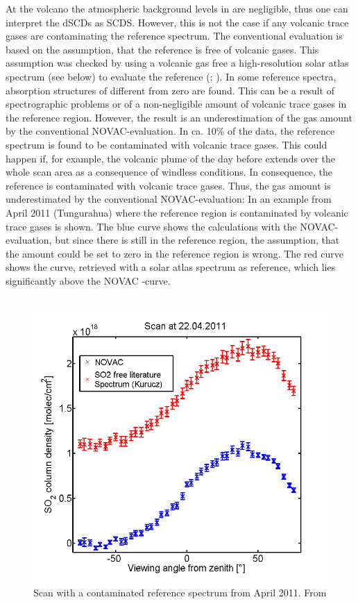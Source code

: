 At the volcano the atmospheric background levels in  are negligible, thus one can interpret the dSCDs as SCDS. However, this is not the case if any volcanic trace gases are contaminating the reference spectrum.
The conventional evaluation is based on the assumption, that the reference is free of volcanic gases. This assumption was checked by using a volcanic gas free a high-resolution solar atlas spectrum (see below) to evaluate the reference (\cite{lubcke2014optical}; \cite{salerno2009novel}). In some reference spectra, absorption structures of   different from zero are found. This can be a result of spectrographic problems or of a non-negligible amount of volcanic trace gases in the reference region. However, the result is an underestimation of the gas amount by the conventional NOVAC-evaluation.
In ca. 10\% of the data, the reference spectrum is found to be contaminated with volcanic trace gases.
This could happen if, for example, the volcanic plume of the day before extends over the whole scan area as a consequence of windless conditions.
In consequence, the reference is contaminated with volcanic trace gases. Thus, the gas amount is underestimated by the conventional NOVAC-evaluation: In  an example from April 2011 (Tungurahua) where the reference region is contaminated by volcanic trace gases is shown. The blue  curve shows the calculations with the NOVAC-evaluation, but since there is still  in the reference region, the assumption, that the  amount could be set to zero in the reference region is wrong. The red curve shows the  curve, retrieved with a solar atlas spectrum as reference, which lies significantly above the NOVAC -curve.\\
\\    
%
\begin{figure}
	\centering
	\includegraphics[width=0.7\linewidth]{Bilder/contaminated}
	\caption{Scan with a contaminated reference spectrum from April 2011. From \cite{WarnachSimon}}
	\label{fig:contaminated}
\end{figure}

